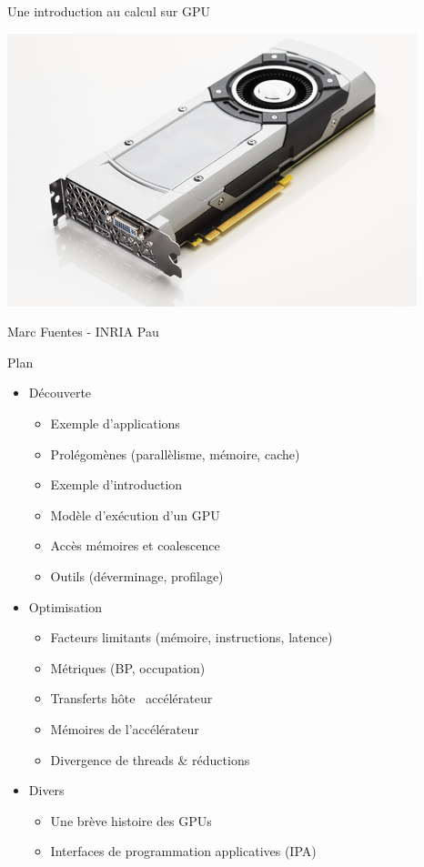 \documentclass[11pt,mathserif]{beamer}
\newcommand{\geziBikoitz}{\faArrowsH}
\begin{document}
\begin{frame}
\begin{center}
  {\Large Une introduction au calcul sur GPU} 
\end{center}
\begin{center}
\includegraphics[width=0.5\linewidth]{fig/gpu.jpg}
\end{center}
 \begin{center}
{\large Marc Fuentes - INRIA Pau\\ }
\end{center}
\end{frame}

\begin{frame}{Plan}
\begin{itemize}[<+->]
   \item Découverte
     \begin{itemize}
       \item Exemple d'applications 
       \item Prolégomènes (parallèlisme, mémoire, cache)
       \item Exemple d'introduction
       \item Modèle d'exécution d'un GPU
       \item Accès mémoires et coalescence
       \item Outils (déverminage, profilage)
     \end{itemize}
 \item Optimisation 
     \begin{itemize}
       \item Facteurs limitants (mémoire, instructions, latence)
       \item Métriques (BP, occupation)
       \item Transferts hôte \geziBikoitz\ accélérateur
       \item Mémoires de l'accélérateur
       \item Divergence de threads \& réductions
     \end{itemize}
  \item Divers
     \begin{itemize}
       \item Une brève histoire des GPUs
       \item Interfaces de programmation applicatives (IPA)
     \end{itemize}
\end{itemize}
\end{frame}
\end{document}
